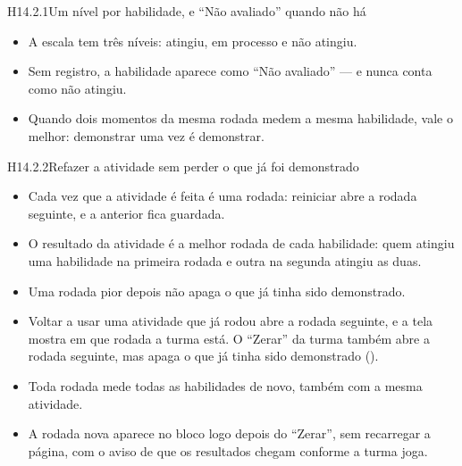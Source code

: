 
\begin{historia}{H14.2.1}{Um nível por habilidade, e \enquote{Não avaliado} quando não há}{\pronto}
\aceite
\begin{itemize}
  \item A escala tem três níveis: atingiu, em processo e não atingiu.
  \item Sem registro, a habilidade aparece como \enquote{Não avaliado} --- e
    nunca conta como não atingiu.
  \item Quando dois momentos da mesma rodada medem a mesma habilidade, vale o
    melhor: demonstrar uma vez é demonstrar.
\end{itemize}
\end{historia}

\begin{historia}{H14.2.2}{Refazer a atividade sem perder o que já foi demonstrado}{\pronto}
\aceite
\begin{itemize}
  \item Cada vez que a atividade é feita é uma rodada: reiniciar abre a rodada
    seguinte, e a anterior fica guardada.
  \item O resultado da atividade é a melhor rodada de cada habilidade: quem
    atingiu uma habilidade na primeira rodada e outra na segunda atingiu as
    duas.
  \item Uma rodada pior depois não apaga o que já tinha sido demonstrado.
  \item Voltar a usar uma atividade que já rodou abre a rodada seguinte, e a
    tela mostra em que rodada a turma está. O \enquote{Zerar} da turma também
    abre a rodada seguinte, mas apaga o que já tinha sido demonstrado
    ().
  \item Toda rodada mede todas as habilidades de novo, também com a mesma
    atividade.
  \item A rodada nova aparece no bloco logo depois do \enquote{Zerar}, sem
    recarregar a página, com o aviso de que os resultados chegam conforme a
    turma joga.
\end{itemize}
\end{historia}


